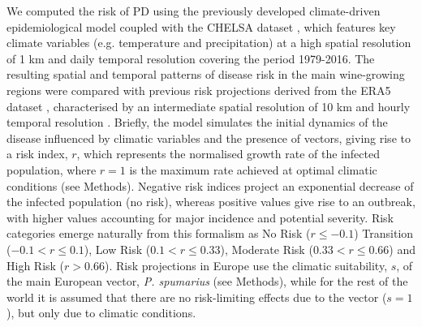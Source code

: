 We computed the risk of PD using the previously developed climate-driven
epidemiological model \cite{GimenezRomero2022_CommsBio} coupled with the CHELSA
dataset
\cite{Karger2017}, which features key climate variables (e.g. temperature and
precipitation) at a high spatial resolution of 1 km and daily temporal
resolution covering the period 1979-2016. The resulting spatial and temporal
patterns of disease risk in the main wine-growing regions were compared with
previous risk projections derived from the ERA5 dataset
\cite{munoz-sabater_era5-land_2021}, characterised by an intermediate  spatial
resolution of 10 km  and hourly temporal resolution
\cite{GimenezRomero2022_CommsBio}.
Briefly, the model simulates the initial dynamics of the disease  influenced by
climatic variables and the presence of vectors, giving rise to a risk index,
$r$, which represents the normalised growth rate of the infected population,
where $r=1$ is the maximum rate achieved at optimal climatic conditions (see
Methods). Negative risk indices project an exponential decrease of the infected
population (no risk), whereas positive values give rise to an outbreak, with
higher values accounting for major incidence and potential severity. Risk
categories  emerge naturally from this formalism as No Risk ($r\leq-0.1$)
Transition ($-0.1<r \leq0.1$), Low Risk ($0.1<r\leq0.33$), Moderate Risk
($0.33<r\leq0.66$) and High Risk ($r>0.66$). Risk projections in Europe use the
climatic suitability, $s$, of the main European vector, \textit{P. spumarius}
(see Methods), while for the rest of the world it is assumed that there are no
risk-limiting effects due to the vector  ($s=1$), but only due to climatic
conditions.

